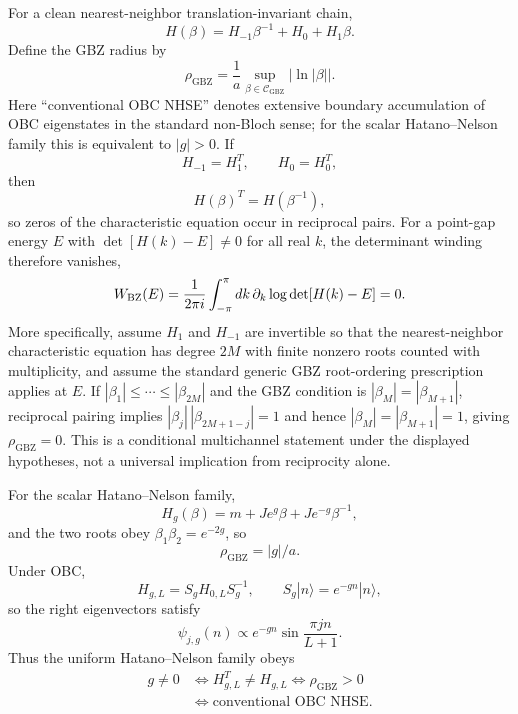 \documentclass[reprint,amsmath,amssymb,aps,nofootinbib]{revtex4-2}
\newcommand{\GBZ}{\mathrm{GBZ}}
\begin{document}
For a clean nearest-neighbor translation-invariant chain,
\begin{equation}
H(\beta)=H_{-1}\beta^{-1}+H_0+H_1\beta.
\end{equation}
Define the GBZ radius by
\begin{equation}
\boxed{
\rho_{\GBZ}=
\frac1a\sup_{\beta\in\mathcal C_{\GBZ}}|\ln|\beta||.
}
\end{equation}
Here ``conventional OBC NHSE'' denotes extensive boundary accumulation of OBC eigenstates in the
standard non-Bloch sense; for the scalar Hatano--Nelson family this is equivalent to $|g|>0$.
If
\begin{equation}
H_{-1}=H_1^T,
\qquad H_0=H_0^T,
\end{equation}
then
\begin{equation}
H(\beta)^T=H(\beta^{-1}),
\end{equation}
so zeros of the characteristic equation occur in reciprocal pairs. For a point-gap energy $E$
with $\det[H(k)-E]\neq0$ for all real $k$, the determinant winding therefore vanishes,
\begin{equation}
W_{\rm BZ}(E)=\frac1{2\pi i}\int_{-\pi}^{\pi}dk\,\partial_k\log\det[H(k)-E]=0.
\end{equation}
More specifically, assume $H_1$ and $H_{-1}$ are invertible so that the nearest-neighbor
characteristic equation has degree $2M$ with finite nonzero roots counted with multiplicity, and
assume the standard generic GBZ root-ordering prescription applies at $E$. If
$|\beta_1|\le\cdots\le|\beta_{2M}|$ and the GBZ condition is
$|\beta_M|=|\beta_{M+1}|$, reciprocal pairing implies
$|\beta_j|\,|\beta_{2M+1-j}|=1$ and hence
$|\beta_M|=|\beta_{M+1}|=1$, giving $\rho_{\GBZ}=0$. This is a conditional multichannel
statement under the displayed hypotheses, not a universal implication from reciprocity alone.

For the scalar Hatano--Nelson family,
\begin{equation}
H_g(\beta)=m+Je^g\beta+Je^{-g}\beta^{-1},
\end{equation}
and the two roots obey $\beta_1\beta_2=e^{-2g}$, so
\begin{equation}
\boxed{\rho_{\GBZ}=|g|/a.}
\end{equation}
Under OBC,
\begin{equation}
H_{g,L}=S_gH_{0,L}S_g^{-1},
\qquad S_g|n\rangle=e^{-gn}|n\rangle,
\end{equation}
so the right eigenvectors satisfy
\begin{equation}
\psi_{j,g}(n)\propto e^{-gn}\sin\frac{\pi jn}{L+1}.
\end{equation}
Thus the uniform Hatano--Nelson family obeys
\begin{equation}
\boxed{\begin{aligned}
g\ne0
&\iff H_{g,L}^T\ne H_{g,L}\iff \rho_{\GBZ}>0\\
&\iff \text{conventional OBC NHSE}.
\end{aligned}}
\end{equation}
\end{document}

